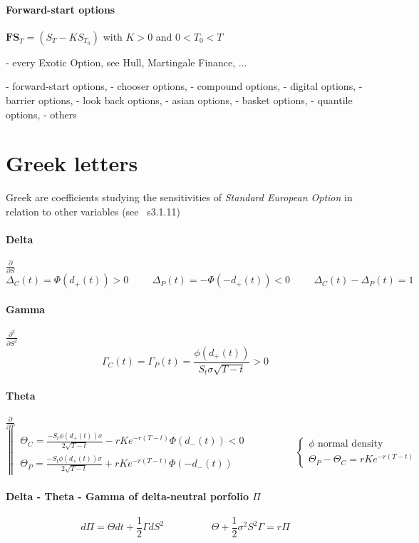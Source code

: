 \documentclass[a4paper,10pt]{article}
\begin{document}
\paragraph{Forward-start options} $\textbf{FS}_T = (S_T - KS_{T_0})$ with $K>0$ and $0<T_0<T$


- every Exotic Option, see Hull, Martingale Finance, ...
 
- forward-start options, 
- chooser options, 
- compound options, 
- digital options, 
- barrier options, 
- look back options, 
- asian options, 
- basket options, 
- quantile options, 
- others

\section{Greek letters}
Greek are coefficients studying the sensitivities of \textit{Standard European Option} in relation to other variables (see~\cite{MAREK} s3.1.11)
\paragraph{Delta} $\frac{\partial}{\partial S}$
\[
\Delta_C(t) = \Phi(d_+(t))>0
\hspace{1cm}
\Delta_P(t) = -\Phi(-d_+(t))<0
\hspace{1cm}
\Delta_C(t) - \Delta_P(t) = 1
\]
\paragraph{Gamma} $\frac{\partial^2}{\partial S^2}$
\[
\Gamma_C(t) = \Gamma_P(t) = \frac{\phi(d_+(t)) }{S_t \sigma \sqrt{T-t}} >0
\]
\paragraph{Theta} $\frac{\partial}{\partial T}$
\[
\left\| 
\begin{array}{l}
\Theta_C = \frac{-S_t \phi(d_+(t)) \sigma}{2\sqrt{T-t}} - rKe^{-r(T-t)} \Phi(d_-(t))  <0 \\
\Theta_P = \frac{-S_t \phi(d_+(t)) \sigma}{2\sqrt{T-t}} + rKe^{-r(T-t)} \Phi(-d_-(t)) 
\end{array}\right. 
\hspace{2cm}
\left\{ 
\begin{array}{l}
\phi \text{ normal density} \\
\Theta_P - \Theta_C = rKe^{-r(T-t)}
\end{array}\right. 
\]
\paragraph{Delta - Theta - Gamma of delta-neutral porfolio $\Pi$}
\[
d\Pi = \Theta dt + \frac{1}{2} \Gamma dS^2
\hspace{2cm}
\Theta + \frac{1}{2}\sigma^2 S^2 \Gamma = r\Pi
\]
\end{document}
